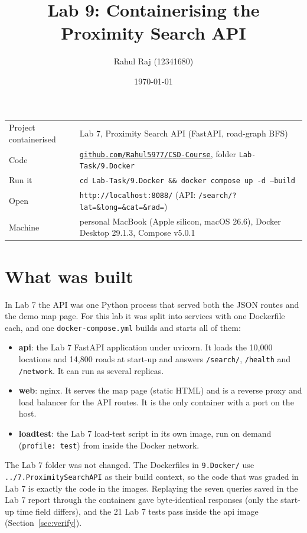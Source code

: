 \documentclass[11pt,a4paper]{article}
\title{\textbf{Lab 9: Containerising the Proximity Search API}}
\author{Rahul Raj \quad (12341680)}
\date{\today}
\newcommand{\repo}{https://github.com/Rahul5977/CSD-Course/tree/main/Lab-Task/9.Docker}
\begin{document}
\maketitle

\begin{center}
\begin{tabularx}{\linewidth}{@{}lL@{}}
\toprule
Project containerised & Lab 7, Proximity Search API (FastAPI, road-graph BFS) \\
Code & \href{\repo}{\texttt{github.com/Rahul5977/CSD-Course}}, folder \texttt{Lab-Task/9.Docker} \\
Run it & \texttt{cd Lab-Task/9.Docker \&\& docker compose up -d --build} \\
Open & \texttt{http://localhost:8088/} \quad (API: \texttt{/search/?lat=\&long=\&cat=\&rad=}) \\
Machine & personal MacBook (Apple silicon, macOS 26.6), Docker Desktop 29.1.3, Compose v5.0.1 \\
\bottomrule
\end{tabularx}
\end{center}

\section{What was built}

In Lab 7 the API was one Python process that served both the JSON routes and the demo map
page. For this lab it was split into services with one Dockerfile each, and one
\texttt{docker-compose.yml} builds and starts all of them:

\begin{itemize}
  \item \textbf{api}: the Lab 7 FastAPI application under uvicorn. It loads the 10{,}000
    locations and 14{,}800 roads at start-up and answers \texttt{/search/}, \texttt{/health} and
    \texttt{/network}. It can run as several replicas.
  \item \textbf{web}: nginx. It serves the map page (static HTML) and is a reverse proxy and
    load balancer for the API routes. It is the only container with a port on the host.
  \item \textbf{loadtest}: the Lab 7 load-test script in its own image, run on demand
    (\texttt{profile: test}) from inside the Docker network.
\end{itemize}

The Lab 7 folder was not changed. The Dockerfiles in \texttt{9.Docker/} use
\texttt{../7.ProximitySearchAPI} as their build context, so the code that was graded in Lab 7 is
exactly the code in the images. Replaying the seven queries saved in the Lab 7 report through
the containers gave byte-identical responses (only the start-up time field differs), and the
21 Lab 7 tests pass inside the api image (Section~\ref{sec:verify}).
\end{document}
